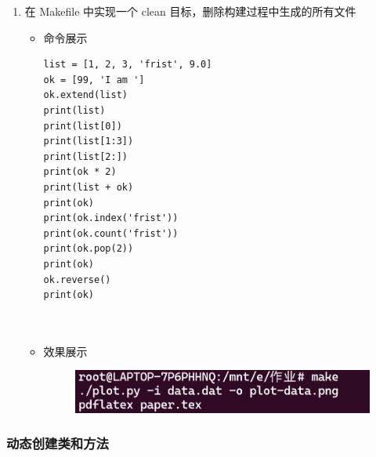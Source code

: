 \documentclass[UTF8]{ctexart}
\begin{document}
\begin{enumerate}
  \item 在 Makefile 中实现一个 clean 目标，删除构建过程中生成的所有文件
  \begin{itemize}
  \item 命令展示
  \begin{verbatim}
list = [1, 2, 3, 'frist', 9.0]
ok = [99, 'I am ']
ok.extend(list)
print(list)
print(list[0])
print(list[1:3])
print(list[2:])
print(ok * 2)
print(list + ok)
print(ok)
print(ok.index('frist'))
print(ok.count('frist'))
print(ok.pop(2))
print(ok)
ok.reverse()
print(ok)

    
  \end{verbatim}

  \item 效果展示

\begin{figure}[H]
    \centering
    \includegraphics[width=\textwidth]{21} %
    
\end{figure}
\end{itemize}
\end{enumerate}
















\subsubsection{动态创建类和方法}
\end{document}
